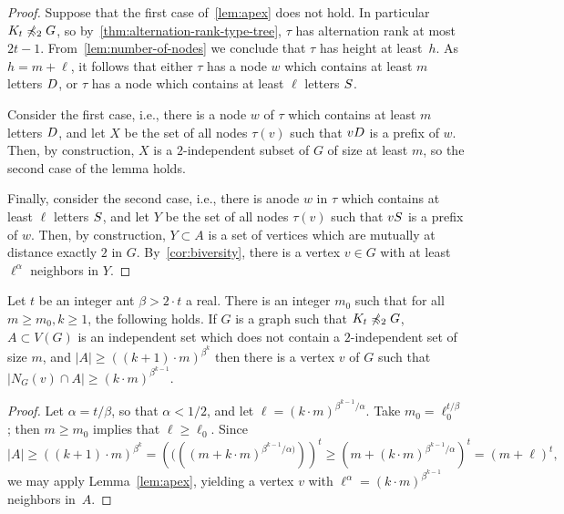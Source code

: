 \begin{proof}
Suppose that the first case of~\cref{lem:apex} does not hold. In particular $K_t\not\preccurlyeq_2 G$, so by~\cref{thm:alternation-rank-type-tree}, $\tau$ has alternation rank at most $2t-1$. From~\cref{lem:number-of-nodes} 
we conclude that $\tau$  has height at least~$h$.
As $h=m+\ell$, it follows that either $\tau$  has a node $w$ which contains at least $m$ letters $D$, or $\tau$ has a node which contains  at least $\ell$ letters $S$.

Consider the first case, i.e., there is a node $w$ of $\tau$
which contains at least $m$ letters $D$, and let $X$
be the set of all nodes $\tau(v)$ such that $vD$ is a prefix of $w$. Then, by construction, $X$ is a $2$-independent subset of $G$ of size at least $m$, so the second case of the lemma holds.

Finally, consider the second case, i.e., there is anode $w$ in $\tau$ which contains at least $\ell$ letters $S$, and let 
$Y$ be the set of all nodes $\tau(v)$ such that $vS$ is a prefix of $w$. Then, by construction, $Y\subset A$ is a set of vertices which are mutually at distance exactly $2$ in $G$. By~\cref{cor:biversity}, there is a vertex $v\in G$
with at least $\ell^{\alpha}$ neighbors in $Y$.
\end{proof}

\begin{corollary}\label{cor:apex}
	Let $t$ be an integer ant $\beta>2\cdot t$ a real. 
	There is an integer $m_0$ such that for all $m\ge m_0,k\ge 1$, the following holds.
	If $G$ is a graph such that $K_t\not\preccurlyeq_2 G$,
	$A\subset V(G)$ is an independent set which does not contain a $2$-independent set of size $m$, and $|A|\ge ((k+1)\cdot m)^{\beta ^k}$
	then there is a vertex $v$ of $G$ such that $|N_G(v)\cap A| \ge (k\cdot m)^{\beta^{k-1}}$.
\end{corollary}
\begin{proof}
Let $\alpha=t/\beta$, so that $\alpha<1/2$, 
 and let 
$\ell=(k\cdot m)^{\beta^{k-1}/\alpha}$.
Take $m_0= \ell_0^{t/\beta}$; then $m\ge m_0$ implies that $\ell\ge\ell_0$.
Since
$$|A|\ge \left((k+1)\cdot m\right)^{\beta^k}=\left ((((m+ k\cdot m)^{\beta^{k-1}/\alpha)}) \right)^t
\ge (m+(k\cdot m)^{\beta^{k-1}/\alpha})^t=(m+\ell)^t,$$
we may  apply Lemma~\ref{lem:apex},
yielding a vertex $v$ with $\ell^\alpha=(k\cdot m)^{\beta^{k-1}}$ neighbors in~$A$.
\end{proof}

